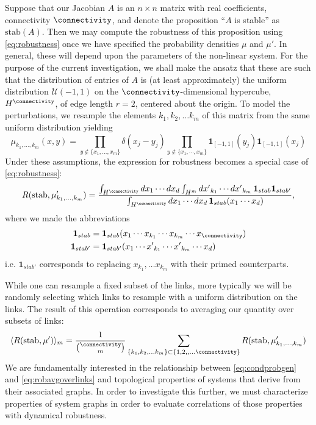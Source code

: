 Suppose that our Jacobian $A$ is an $n \times n$ matrix with real coefficients, connectivity $\connectivity$, and denote the proposition ``$A$ is stable'' as $\mathrm{stab}(A)$.  Then we may compute the robustness of this proposition using \ref{eq:robustness} once we have specified the probability densities $\mu$ and $\mu'$.  In general, these will depend upon the parameters of the non-linear system.  For the purpose of the current investigation, we shall make the ansatz that these are such that the distribution of entries of $A$ is (at least approximately) the uniform distribution $\mathcal{U}(-1,1)$ on the $\connectivity$-dimensional hypercube, $H^\connectivity$, of edge length $r=2$, centered about the origin. To model the perturbations, we resample the elements $k_1, k_2, \ldots k_m$ of this matrix from the same uniform distribution yielding
$$
\mu_{k_1,\ldots,k_m}(x,y) = \prod_{y \notin \{x_1, \ldots, x_m\} } \delta(x_j-y_j) \prod_{y \notin \{x_1,\cdots,x_m\}} \mathbf{1}_{[-1,1]} (y_j) \mathbf{1}_{[-1,1]} (x_j)
$$
Under these assumptions, the expression for robustness becomes a special case of \ref{eq:robustness}:
\begin{equation}\label{eq:condprobgen}
 R (\mathrm{stab}, \mu'_{k_1, \ldots, k_m}) =
  \frac{\int_{H^\connectivity} dx_1 \cdots dx_d \int_{H^m} {dx'}_{k_1} \cdots {dx'}_{k_m}\,
    \mathbf{1}_{stab} \mathbf{1}_{stab'}}
  {\int_{H^\connectivity} dx_1 \cdots dx_d  \, \mathbf{1}_{stab}(x_1 \cdots x_d)},
\end{equation}
where we made the abbreviations
\begin{align*}
\mathbf{1}_{stab} &= \mathbf{1}_{stab}(x_1 \cdots x_{k_1} \cdots x_{k_m} \cdots x_\connectivity) \\
\mathbf{1}_{stab'} &= \mathbf{1}_{stab'}(x_1 \cdots {x'}_{k_1} \cdots {x'}_{k_m}  \cdots x_d)
\end{align*}
i.e. $\mathbf{1}_{stab'}$ corresponds to replacing $x_{k_1}, \ldots x_{k_m}$ with their primed counterparts.

While one can resample a fixed subset of the links, more typically we will be randomly selecting which links to resample with a uniform distribution on the links.  The result of this operation corresponds to averaging our quantity over subsets of links:
\begin{equation}\label{eq:robavgoverlinks}
\langle R (\hbox{stab}, \mu') \rangle_m =
\frac{1}{\binom{\connectivity}{m}}
\sum_{\{k_1, k_2, \ldots k_m\} \subset \{1, 2,, \ldots \connectivity\}}
R (\hbox{stab}, \mu'_{k_1, \ldots, k_m})
\end{equation}
We are fundamentally interested in the relationship between \ref{eq:condprobgen} and \ref{eq:robavgoverlinks} and topological properties of systems that derive from their associated graphs. In order to investigate this further, we must characterize properties of system graphs in order to evaluate correlations of those properties with dynamical robustness.


